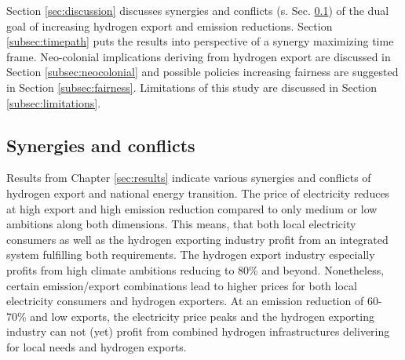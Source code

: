 Section \ref{sec:discussion} discusses synergies and conflicts (s. Sec. \ref{subsec:synergies-conflicts}) of the dual goal of increasing hydrogen export and emission reductions. Section \ref{subsec:timepath} puts the results into perspective of a synergy maximizing time frame. Neo-colonial implications deriving from hydrogen export are discussed in Section \ref{subsec:neocolonial} and possible policies increasing fairness are suggested in Section \ref{subsec:fairness}. Limitations of this study are discussed in Section \ref{subsec:limitations}.



\subsection{Synergies and conflicts}
\label{subsec:synergies-conflicts}
Results from Chapter \ref{sec:results} indicate various synergies and conflicts of hydrogen export and national energy transition. The price of electricity reduces at high export and high emission reduction compared to only medium or low ambitions along both dimensions. This means, that both local electricity consumers as well as the hydrogen exporting industry profit from an integrated system fulfilling both requirements. The hydrogen export industry especially profits from high climate ambitions reducing to 80\% and beyond. Nonetheless, certain emission/export combinations lead to higher prices for both local electricity consumers and hydrogen exporters. At an emission reduction of 60-70\% and low exports, the electricity price peaks and the hydrogen exporting industry can not (yet) profit from combined hydrogen infrastructures delivering for local needs and hydrogen exports.


